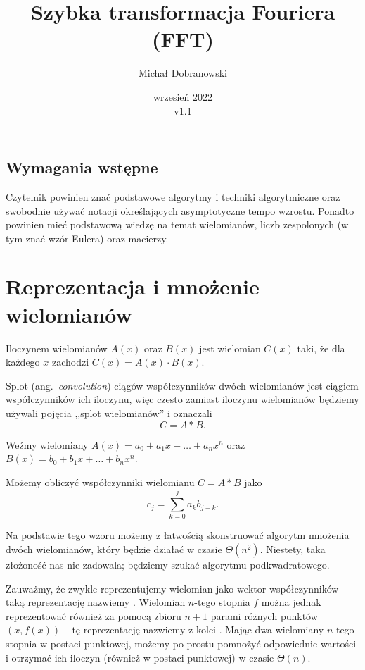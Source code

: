 \documentclass[11pt]{scrartcl}
\title{Szybka transformacja Fouriera (FFT)}
\author{Michał Dobranowski}
\date{wrzesień 2022 \\ v1.1}
\begin{document}
    \maketitle
    \subsection*{Wymagania wstępne}
    Czytelnik powinien znać podstawowe algorytmy i techniki algorytmiczne oraz swobodnie używać notacji określających asymptotyczne tempo wzrostu. Ponadto powinien mieć podstawową wiedzę na temat wielomianów, liczb zespolonych (w tym znać wzór Eulera) oraz macierzy.
    \tableofcontents
    \eject

\section{Reprezentacja i mnożenie wielomianów}
    \begin{definition}
        Iloczynem wielomianów $A(x)$ oraz $B(x)$ jest wielomian $C(x)$ taki, że dla każdego $x$ zachodzi $C(x) = A(x)\cdot B(x)$.
    \end{definition}

    Splot (ang.\ \textit{convolution}) ciągów współczynników dwóch wielomianów jest ciągiem współczynników ich iloczynu, więc czesto zamiast iloczynu wielomianów będziemy używali pojęcia ,,splot wielomianów'' i oznaczali
    \[ C = A * B. \]

    Weźmy wielomiany $A(x) = a_0 + a_1x + \ldots + a_nx^n$ oraz $B(x) = b_0 + b_1x + \ldots + b_nx^n$.
    \begin{fact}
        Możemy obliczyć współczynniki wielomianu $C = A * B$ jako
        $$ c_j = \sum_{k = 0}^j a_kb_{j-k}. $$
    \end{fact}
    Na podstawie tego wzoru możemy z łatwością skonstruować algorytm mnożenia dwóch wielomianów, który będzie działać w czasie $\Theta(n^2)$. Niestety, taka złożoność nas nie zadowala; będziemy szukać algorytmu podkwadratowego.

    Zauważmy, że zwykle reprezentujemy wielomian jako wektor współczynników -- taką reprezentację nazwiemy . Wielomian $n$-tego stopnia $f$ można jednak reprezentować również za pomocą zbioru $n + 1$ parami różnych punktów $(x, f(x))$ -- tę reprezentację nazwiemy z kolei . Mając dwa wielomiany $n$-tego stopnia w postaci punktowej, możemy po prostu pomnożyć odpowiednie wartości i otrzymać ich iloczyn (również w postaci punktowej) w czasie $\Theta(n)$.
\end{document}
